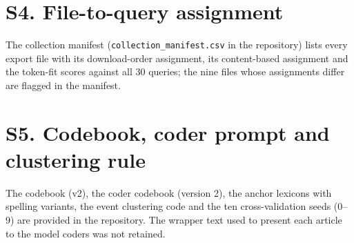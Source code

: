 \documentclass[11pt]{article}
\begin{document}
\section*{S4. File-to-query assignment}
The collection manifest (\texttt{collection\_manifest.csv} in the repository) lists every export file with its download-order assignment, its content-based assignment and the token-fit scores against all 30 queries; the nine files whose assignments differ are flagged in the manifest.

\section*{S5. Codebook, coder prompt and clustering rule}
The codebook (v2), the coder codebook (version 2), the anchor lexicons with spelling variants, the event clustering code and the ten cross-validation seeds (0--9) are provided in the repository. The wrapper text used to present each article to the model coders was not retained.
\end{document}
